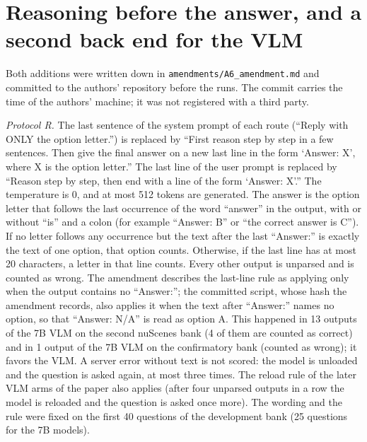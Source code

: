 \documentclass[10pt]{article}
\begin{document}
\section{Reasoning before the answer, and a second back end for the VLM}
Both additions were written down in \texttt{amendments/A6\_amendment.md} and committed to the authors' repository before the runs. The commit carries the time of the authors' machine; it was not registered with a third party.

\emph{Protocol R.} The last sentence of the system prompt of each route (``Reply with ONLY the option letter.'') is replaced by ``First reason step by step in a few sentences. Then give the final answer on a new last line in the form `Answer: X', where X is the option letter.'' The last line of the user prompt is replaced by ``Reason step by step, then end with a line of the form `Answer: X'.'' The temperature is 0, and at most 512 tokens are generated. The answer is the option letter that follows the last occurrence of the word ``answer'' in the output, with or without ``is'' and a colon (for example ``Answer: B'' or ``the correct answer is C''). If no letter follows any occurrence but the text after the last ``Answer:'' is exactly the text of one option, that option counts. Otherwise, if the last line has at most 20 characters, a letter in that line counts. Every other output is unparsed and is counted as wrong. The amendment describes the last-line rule as applying only when the output contains no ``Answer:''; the committed script, whose hash the amendment records, also applies it when the text after ``Answer:'' names no option, so that ``Answer: N/A'' is read as option A. This happened in 13 outputs of the 7B VLM on the second nuScenes bank (4 of them are counted as correct) and in 1 output of the 7B VLM on the confirmatory bank (counted as wrong); it favors the VLM. A server error without text is not scored: the model is unloaded and the question is asked again, at most three times. The reload rule of the later VLM arms of the paper also applies (after four unparsed outputs in a row the model is reloaded and the question is asked once more). The wording and the rule were fixed on the first 40 questions of the development bank (25 questions for the 7B models).
\end{document}
